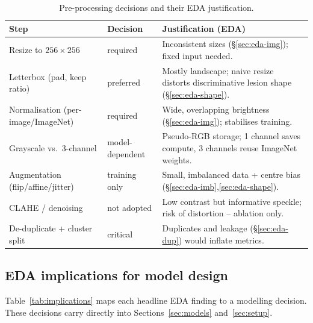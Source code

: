 \documentclass[11pt]{article}
\begin{document}
\begin{table}[t]
\centering
\caption{Pre-processing decisions and their EDA justification.}
\label{tab:preproc}
\small
\begin{tabularx}{\linewidth}{@{}L{4.3cm} l Y@{}}
\toprule
Step & Decision & Justification (EDA) \\
\midrule
Resize to $256\times256$        & required  & Inconsistent sizes (\S\ref{sec:eda-img}); fixed input needed. \\
Letterbox (pad, keep ratio)     & preferred & Mostly landscape; naive resize distorts discriminative lesion shape (\S\ref{sec:eda-shape}). \\
Normalisation (per-image/ImageNet)& required & Wide, overlapping brightness (\S\ref{sec:eda-img}); stabilises training. \\
Grayscale vs.\ 3-channel        & model-dependent & Pseudo-RGB storage; 1 channel saves compute, 3 channels reuse ImageNet weights. \\
Augmentation (flip/affine/jitter)& training only & Small, imbalanced data + centre bias (\S\ref{sec:eda-imb},\ref{sec:eda-shape}). \\
CLAHE / denoising               & not adopted & Low contrast but informative speckle; risk of distortion -- ablation only. \\
De-duplicate + cluster split    & critical  & Duplicates and leakage (\S\ref{sec:eda-dup}) would inflate metrics. \\
\bottomrule
\end{tabularx}
\end{table}

\subsection{EDA implications for model design}
\label{sec:eda-implications}
Table~\ref{tab:implications} maps each headline EDA finding to a modelling
decision. These decisions carry directly into Sections~\ref{sec:models}
and~\ref{sec:setup}.
\end{document}
